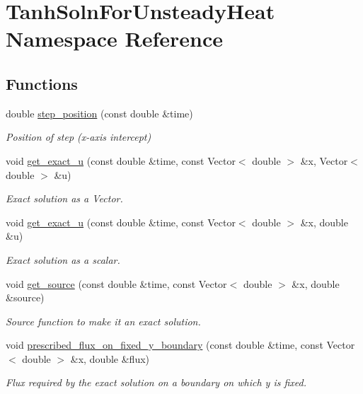 \hypertarget{namespaceTanhSolnForUnsteadyHeat}{}\section{Tanh\+Soln\+For\+Unsteady\+Heat Namespace Reference}
\label{namespaceTanhSolnForUnsteadyHeat}
\subsection*{Functions}
\begin{DoxyCompactItemize}
\item 
double \hyperlink{namespaceTanhSolnForUnsteadyHeat_a99f50e575e38e80aa305ead2d4497272}{step\+\_\+position} (const double \&time)
\begin{DoxyCompactList}\small\item\em Position of step (x-\/axis intercept) \end{DoxyCompactList}\item 
void \hyperlink{namespaceTanhSolnForUnsteadyHeat_a36857bbdec45f44018772de70558db7d}{get\+\_\+exact\+\_\+u} (const double \&time, const Vector$<$ double $>$ \&x, Vector$<$ double $>$ \&u)
\begin{DoxyCompactList}\small\item\em Exact solution as a Vector. \end{DoxyCompactList}\item 
void \hyperlink{namespaceTanhSolnForUnsteadyHeat_a62871b93b792298dcdade93bde0085ff}{get\+\_\+exact\+\_\+u} (const double \&time, const Vector$<$ double $>$ \&x, double \&u)
\begin{DoxyCompactList}\small\item\em Exact solution as a scalar. \end{DoxyCompactList}\item 
void \hyperlink{namespaceTanhSolnForUnsteadyHeat_aea922a29dfeeb80ef4768def0d6fbde4}{get\+\_\+source} (const double \&time, const Vector$<$ double $>$ \&x, double \&source)
\begin{DoxyCompactList}\small\item\em Source function to make it an exact solution. \end{DoxyCompactList}\item 
void \hyperlink{namespaceTanhSolnForUnsteadyHeat_af4d78d73bd9981a5a9ecacecfd0e9cb8}{prescribed\+\_\+flux\+\_\+on\+\_\+fixed\+\_\+y\+\_\+boundary} (const double \&time, const Vector$<$ double $>$ \&x, double \&flux)
\begin{DoxyCompactList}\small\item\em Flux required by the exact solution on a boundary on which y is fixed. \end{DoxyCompactList}\end{DoxyCompactItemize}
